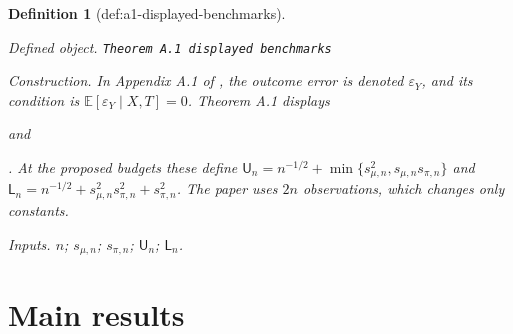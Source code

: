 \documentclass{article}
\newtheorem{definition}{Definition}
\begin{document}
\begin{definition}[def:a1-displayed-benchmarks]\label{def:a1-displayed-benchmarks}
\par\smallskip\noindent\emph{Defined object.} \texttt{Theorem A.1 displayed benchmarks}
\par\smallskip\noindent\emph{Construction.} In Appendix A.1 of \cite{gu2026optimally}, the outcome error is denoted \(\varepsilon_Y\), and its condition is \(\mathbb E[\varepsilon_Y\mid X,T]=0\). Theorem A.1 displays \par\noindent {}\par\noindent and \par\noindent {}\par\noindent. At the proposed budgets these define \(\mathsf U_n=n^{-1/2}+\min\{s_{\mu,n}^2,s_{\mu,n}s_{\pi,n}\}\) and \(\mathsf L_n=n^{-1/2}+s_{\mu,n}^2s_{\pi,n}^2+s_{\pi,n}^2\). The paper uses \(2n\) observations, which changes only constants.
\par\smallskip\noindent\emph{Inputs.} \(n\); \(s_{\mu,n}\); \(s_{\pi,n}\); \(\mathsf U_n\); \(\mathsf L_n\).
\end{definition}

\section{Main results}
\end{document}
